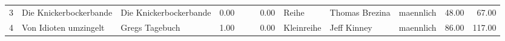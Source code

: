 \begin{table}
\begin{center}
{\begin{tabular}{rllrllrlllrr}
  3 & Die Knickerbockerbande                                                                                                                                                                                                                                          & Die Knickerbockerbande                                                                                                                                                                                                                                          & 0.00 &                                                                                                                                                                                                                                                                 &                                                                                                                                                                                                                                                                 & 0.00 & Reihe & Thomas Brezina                                                                                                                                                                                                                                                  & maennlich & 48.00 & 67.00 \\ 
  4 & Von Idioten umzingelt                                                                                                                                                                                                                                           & Gregs Tagebuch                                                                                                                                                                                                                                                  & 1.00 &                                                                                                                                                                                                                                                                 &                                                                                                                                                                                                                                                                 & 0.00 & Kleinreihe & Jeff Kinney                                                                                                                                                                                                                                                     & maennlich & 86.00 & 117.00 \\ 

\end{tabular}}
\end{center}
\end{table}
